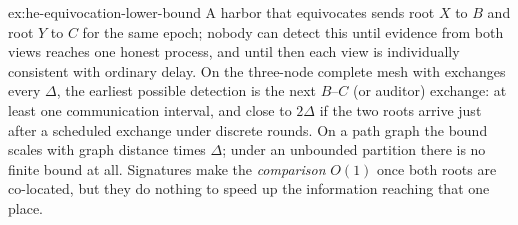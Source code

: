 \documentclass[11pt,a4paper]{article}
\theoremstyle{definition}
\theoremstyle{definition}
\theoremstyle{remark}
\begin{document}
\begin{pdsolution}{ex:he-equivocation-lower-bound}
A harbor that equivocates sends root $X$ to $B$ and root $Y$ to $C$ for the
same epoch; nobody can detect this until evidence from both views reaches one
honest process, and until then each view is individually consistent with
ordinary delay. On the three-node complete mesh with exchanges every $\Delta$,
the earliest possible detection is the next $B$--$C$ (or auditor) exchange: at
least one communication interval, and close to $2\Delta$ if the two roots arrive
just after a scheduled exchange under discrete rounds. On a path graph the bound
scales with graph distance times $\Delta$; under an unbounded partition there is
no finite bound at all. Signatures make the \emph{comparison} $O(1)$ once both
roots are co-located, but they do nothing to speed up the information reaching
that one place.
\end{pdsolution}

\end{document}
